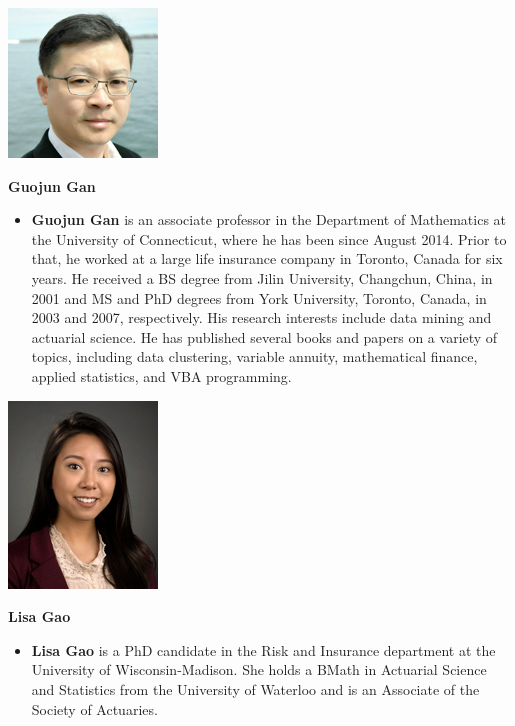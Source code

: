 \documentclass[
  12pt,
  krantz2]{Format/krantzNoCorner}
\providecommand{\tightlist}{%
  \setlength{\itemsep}{0pt}\setlength{\parskip}{0pt}}
\begin{document}
\newpage

\begin{center}\includegraphics[width=0.2\linewidth,height=0.3\textheight]{ContributorPics/GuojunGan} \end{center}

\begin{center}
\textbf{ Guojun Gan }
\end{center}

\begin{itemize}
\tightlist
\item
  \textbf{Guojun Gan} is an associate professor in the Department of Mathematics at the University of Connecticut, where he has been since August 2014. Prior to that, he worked at a large life insurance company in Toronto, Canada for six years. He received a BS degree from Jilin University, Changchun, China, in 2001 and MS and PhD degrees from York University, Toronto, Canada, in 2003 and 2007, respectively. His research interests include data mining and actuarial science. He has published several books and papers on a variety of topics, including data clustering, variable annuity, mathematical finance, applied statistics, and VBA programming.
\end{itemize}

\begin{center}\includegraphics[width=0.2\linewidth,height=0.3\textheight]{ContributorPics/Gao_Lisa_150x188} \end{center}

\begin{center}
\textbf{ Lisa Gao }
\end{center}

\begin{itemize}
\tightlist
\item
  \textbf{Lisa Gao} is a PhD candidate in the Risk and Insurance department at the University of Wisconsin-Madison. She holds a BMath in Actuarial Science and Statistics from the University of Waterloo and is an Associate of the Society of Actuaries.
\end{itemize}
\end{document}
